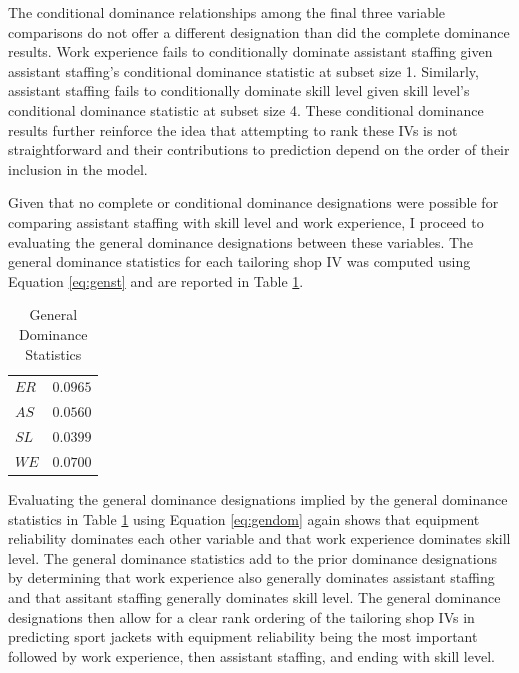 \documentclass[ShortAfour,times,sageapa]{sagej}
\begin{document}
	The conditional dominance relationships among the final three variable comparisons do not offer a different designation than did the complete dominance results.
	Work experience fails to conditionally dominate assistant staffing given assistant staffing's conditional dominance statistic at subset size 1. 
	Similarly, assistant staffing fails to conditionally dominate skill level given skill level's conditional dominance statistic at subset size 4.
	These conditional dominance results further reinforce the idea that attempting to rank these IVs is not straightforward and their contributions to prediction depend on the order of their inclusion in the model. 
	
	Given that no complete or conditional dominance designations were possible for comparing assistant staffing with skill level and work experience, I proceed to evaluating the general dominance designations between these variables. 
	The general dominance statistics for each tailoring shop IV was computed using Equation \ref{eq:genst} and are reported in Table \ref{tab:gen}.
	
	\begin{table}[h!]
		\centering
		\caption{\centering General Dominance Statistics}
		\begin{tabular}{l|r}
			\toprule
			$ER$ & $0.0965$ \\ 
			$AS$ & $0.0560$ \\ 
			$SL$ & $0.0399$ \\ 
			$WE$ & $0.0700$ \\ 
			\bottomrule
		\end{tabular}
		\label{tab:gen}
	\end{table}

	Evaluating the general dominance designations implied by the general dominance statistics in Table \ref{tab:gen} using Equation \ref{eq:gendom} again shows that equipment reliability dominates each other variable and that work experience dominates skill level. 
	The general dominance statistics add to the prior dominance designations by determining that work experience also generally dominates assistant staffing and that assitant staffing generally dominates skill level.
	The general dominance designations then allow for a clear rank ordering of the tailoring shop IVs in predicting sport jackets with equipment reliability being the most important followed by work experience, then assistant staffing, and ending with skill level.
	
\end{document}
